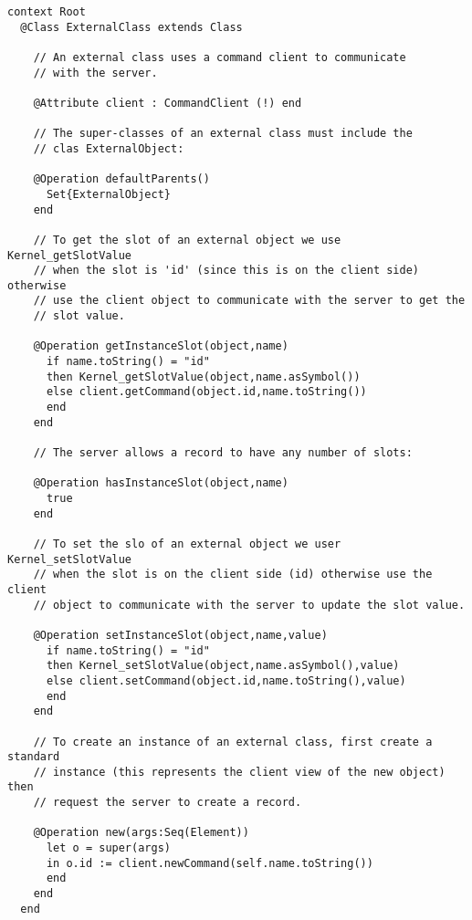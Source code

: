 \documentclass{article}
\begin{document}
\begin{verbatim}
context Root
  @Class ExternalClass extends Class
    
    // An external class uses a command client to communicate
    // with the server.
    
    @Attribute client : CommandClient (!) end
    
    // The super-classes of an external class must include the
    // clas ExternalObject:
    
    @Operation defaultParents()
      Set{ExternalObject}
    end
    
    // To get the slot of an external object we use Kernel_getSlotValue
    // when the slot is 'id' (since this is on the client side) otherwise
    // use the client object to communicate with the server to get the
    // slot value.
    
    @Operation getInstanceSlot(object,name)
      if name.toString() = "id"
      then Kernel_getSlotValue(object,name.asSymbol())
      else client.getCommand(object.id,name.toString())
      end
    end
    
    // The server allows a record to have any number of slots:
    
    @Operation hasInstanceSlot(object,name)
      true
    end
    
    // To set the slo of an external object we user Kernel_setSlotValue
    // when the slot is on the client side (id) otherwise use the client 
    // object to communicate with the server to update the slot value.
    
    @Operation setInstanceSlot(object,name,value)
      if name.toString() = "id"
      then Kernel_setSlotValue(object,name.asSymbol(),value)
      else client.setCommand(object.id,name.toString(),value)
      end
    end
    
    // To create an instance of an external class, first create a standard
    // instance (this represents the client view of the new object) then
    // request the server to create a record.
    
    @Operation new(args:Seq(Element))
      let o = super(args)
      in o.id := client.newCommand(self.name.toString())
      end
    end
  end
\end{verbatim}
\end{document}
